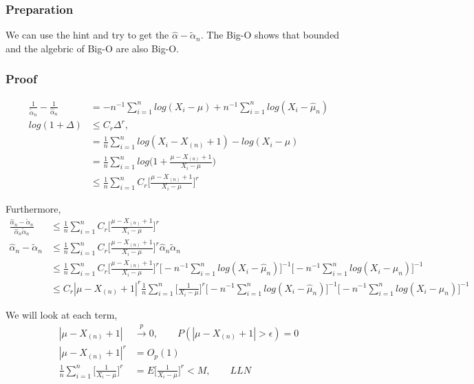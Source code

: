 	
\subsubsection{Preparation}	
We can use the hint and try to get the $\hat{\alpha} - \tilde{\alpha}_n$. The Big-O shows that bounded and the algebric of Big-O are also Big-O. 



\subsubsection{Proof}	

 \begin{align*}
 	\frac{1}{ \tilde{\alpha}_n} - \frac{1}{\hat{\alpha}_n} &= -n^{-1} \sum_{i=1}^n log(X_i - \mu)  + n^{-1} \sum_{i=1}^n log(X_i - \hat{\mu}_n)  \\
	log(1+ \Delta) & \leq C_r \Delta^r, \\
	&= \frac{1}{n} \sum_{i=1}^n log(X_i - X_{(n)} + 1) - log(X_i - \mu)  \\
	&= \frac{1}{n} \sum_{i=1}^n log \Big(1+ \frac{\mu-X_{(n)} + 1}{X_i - \mu} \Big) \\
	& \leq \frac{1}{n} \sum_{i=1}^n C_r \Big[ \frac{\mu - X_{(n)} + 1}{X_i - \mu} \Big]^r 
 \end{align*}  

Furthermore,
\begin{align*}
	\frac{\hat{\alpha}_n - \tilde{\alpha}_n}{\hat{\alpha}_n \tilde{\alpha}_n} & \leq \frac{1}{n} \sum_{i=1}^n C_r \Big[ \frac{\mu - X_{(n)} + 1}{X_i - \mu} \Big]^r\\
	\hat{\alpha}_n - \tilde{\alpha}_n & \leq \frac{1}{n} \sum_{i=1}^n C_r \Big[ \frac{\mu - X_{(n)} + 1}{X_i - \mu} \Big]^r \hat{\alpha}_n \tilde{\alpha}_n \\
	& \leq \frac{1}{n} \sum_{i=1}^n C_r \Big[ \frac{\mu - X_{(n)} + 1}{X_i - \mu} \Big]^r \Big[ -n^{-1} \sum_{i=1}^n log(X_i - \hat{\mu}_n) \Big]^{-1} \Big[ -n^{-1} \sum_{i=1}^n log(X_i - \mu_n) \Big]^{-1} \\
	& \leq C_r  |\mu - X_{(n)} + 1|^r \frac{1}{n} \sum_{i=1}^n \Big[ \frac{1}{X_i - \mu} \Big]^r \Big[ -n^{-1} \sum_{i=1}^n log(X_i - \hat{\mu}_n) \Big]^{-1} \Big[ -n^{-1} \sum_{i=1}^n log(X_i - \mu_n) \Big]^{-1}
\end{align*} 

We will look at each term,
 \begin{align*}
 	|\mu - X_{(n)} + 1| & \xrightarrow {p} 0, \qquad P(|\mu - X_{(n)} + 1| > \epsilon) = 0 \\
	|\mu - X_{(n)} + 1|^r &= O_p(1) \\
	\frac{1}{n} \sum_{i=1}^n \Big[ \frac{1}{X_i - \mu} \Big]^r &= E \Big[ \frac{1}{X_i - \mu} \Big]^r < M, \qquad LLN \\
\end{align*}  
		

